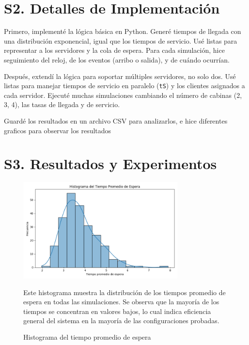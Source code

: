 \documentclass[12pt]{article}
\begin{document}
\section*{S2. Detalles de Implementación}

Primero, implementé la lógica básica en Python. Generé tiempos de llegada con una distribución exponencial, igual que los tiempos de servicio. Usé listas para representar a los servidores y la cola de espera. Para cada simulación, hice seguimiento del reloj, de los eventos (arribo o salida), y de cuándo ocurrían.

Después, extendí la lógica para soportar múltiples servidores, no solo dos. Usé listas para manejar tiempos de servicio en paralelo (\texttt{tS}) y los clientes asignados a cada servidor. Ejecuté muchas simulaciones cambiando el número de cabinas (2, 3, 4), las tasas de llegada y de servicio.

Guardé los resultados en un archivo CSV para analizarlos, e hice diferentes graficos para observar los resultados 

\section*{S3. Resultados y Experimentos}

\begin{figure}[H]
    \centering
    \includegraphics[width=0.75\textwidth]{histograma_espera.png}
    \caption{Histograma del tiempo promedio de espera}
    \small Este histograma muestra la distribución de los tiempos promedio de espera en todas las simulaciones. Se observa que la mayoría de los tiempos se concentran en valores bajos, lo cual indica eficiencia general del sistema en la mayoría de las configuraciones probadas.
    \end{figure}
    
\end{document}
